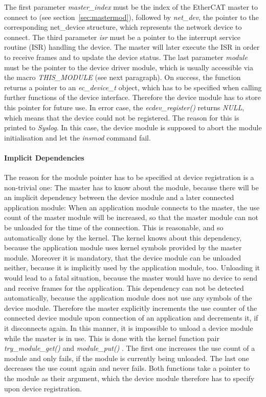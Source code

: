 \documentclass[a4paper,12pt,BCOR6mm,bibtotoc,idxtotoc]{scrbook}
\begin{document}
The first parameter \textit{master\_index} must be the index of the
EtherCAT master to connect to (see section~\ref{sec:mastermod}),
followed by \textit{net\_dev}, the pointer to the corresponding
net\_device structure, which represents the network device to connect.
The third parameter \textit{isr} must be a pointer to the interrupt
service routine (ISR) handling the device. The master will
later execute the ISR in order to receive frames and to update the
device status. The last parameter \textit{module} must be the pointer
to the device driver module, which is usually accessible via the macro
\textit{THIS\_MODULE} (see next paragraph). On success, the function
returns a pointer to an \textit{ec\_device\_t} object, which has to be
specified when calling further functions of the device interface.
Therefore the device module has to store this pointer for future use.
In error case, the \textit{ecdev\_register()} returns \textit{NULL},
which means that the device could not be registered.  The reason for
this is printed to \textit{Syslog}. In this case, the
device module is supposed to abort the module initialisation and let
the \textit{insmod} command fail.

\paragraph{Implicit Dependencies}

The reason for the module pointer has to be specified at device registration is
a non-trivial one: The master has to know about the module, because there will
be an implicit dependency between the device module and a later connected
application module: When an application module connects to the master, the use
count of the master module will be increased, so that the master module can not
be unloaded for the time of the connection. This is reasonable, and so
automatically done by the kernel. The kernel knows about this dependency,
because the application module uses kernel symbols provided by the master
module.  Moreover it is mandatory, that the device module can be unloaded
neither, because it is implicitly used by the application module, too.
Unloading it would lead to a fatal situation, because the master would have no
device to send and receive frames for the application. This dependency can not
be detected automatically, because the application module does not use any
symbols of the device module. Therefore the master explicitly increments the
use counter of the connected device module upon connection of an application
and decrements it, if it disconnects again. In this manner, it is impossible to
unload a device module while the master is in use. This is done with the kernel
function pair \textit{try\_module\_get()}
 and \textit{module\_put()}
. The first one increases the use
count of a module and only fails, if the module is currently being unloaded.
The last one decreases the use count again and never fails. Both functions take
a pointer to the module as their argument, which the device module therefore
has to specify upon device registration.
\end{document}
